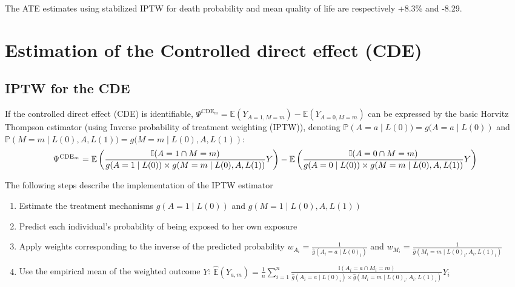 \documentclass[
]{book}
\begin{document}
The ATE estimates using stabilized IPTW for death probability and mean quality of life are respectively +8.3\% and -8.29.

\hypertarget{estimation-of-the-controlled-direct-effect-cde}{%
\section{Estimation of the Controlled direct effect (CDE)}\label{estimation-of-the-controlled-direct-effect-cde}}

\hypertarget{iptw-for-the-cde}{%
\subsection{IPTW for the CDE}\label{iptw-for-the-cde}}

If the controlled direct effect (CDE) is identifiable, \(\Psi^{\text{CDE}_m} = \mathbb{E}(Y_{A=1,M=m}) - \mathbb{E}(Y_{A=0,M=m})\) can be expressed by the basic Horvitz Thompson estimator (using Inverse probability of treatment weighting (IPTW)), denoting \(\mathbb{P}\left(A=a \mid L(0)) = g(A=a \mid L(0)\right)\) and \(\mathbb{P}\left(M=m \mid L(0),A,L(1)) = g(M=m \mid L(0),A,L(1)\right)\):
\begin{equation}
\small
\Psi^{\text{CDE}_m} = \mathbb{E}\left( \frac{\mathbb{I}(A=1 \cap M=m)}{g(A=1 \mid L(0)) \times g(M=m \mid L(0),A,L(1))} Y \right) - \mathbb{E}\left( \frac{\mathbb{I}(A=0 \cap M=m)}{g(A=0 \mid L(0)) \times g(M=m \mid L(0),A,L(1))} Y \right)
\end{equation}

The following steps describe the implementation of the IPTW estimator

\begin{enumerate}
\def\labelenumi{\arabic{enumi}.}
\item
  Estimate the treatment mechanisms \(g\left(A=1 \mid L(0)\right)\) and \(g\left(M=1 \mid L(0),A,L(1)\right)\)
\item
  Predict each individual's probability of being exposed to her own exposure
\item
  Apply weights corresponding to the inverse of the predicted probability \(w_{A_i} = \frac{1}{\hat{g}(A_i = a \mid L(0)_i)}\) and \(w_{M_i} = \frac{1}{\hat{g}(M_i = m \mid L(0)_i,A_i,L(1)_i)}\)
\item
  Use the empirical mean of the weighted outcome \(Y\): \(\hat{\mathbb{E}}(Y_{a,m}) = \frac{1}{n} \sum_{i=1}^n \frac{\mathbb{I}(A_i=a \cap M_i=m)}{\hat{g}(A_i=a \mid L(0)_i) \times \hat{g}(M_i=m \mid L(0)_i,A_i,L(1)_i)} Y_i\)
\end{enumerate}
\end{document}
